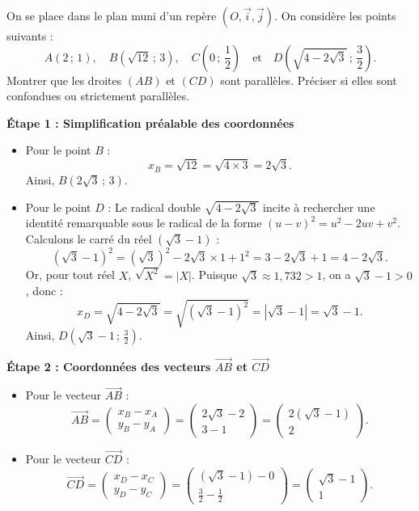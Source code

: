 \documentclass[11pt,a4paper]{article}
\newcommand{\vect}[1]{\overrightarrow{#1}}
\begin{document}
\begin{enoncebox}
On se place dans le plan muni d'un repère $(O, \vec{i}, \vec{j})$.
On considère les points suivants :
\[
A(2\,;\,1), \quad B(\sqrt{12}\,;\,3), \quad C\left(0\,;\,\frac{1}{2}\right) \quad \text{et} \quad D\left(\sqrt{4 - 2\sqrt{3}}\,;\,\frac{3}{2}\right).
\]
Montrer que les droites $(AB)$ et $(CD)$ sont parallèles. Préciser si elles sont confondues ou strictement parallèles.
\end{enoncebox}

\begin{correctionbox}
\textbf{Étape 1 : Simplification préalable des coordonnées}
\begin{itemize}[leftmargin=1cm]
    \item Pour le point $B$ :
    \[
    x_B = \sqrt{12} = \sqrt{4 \times 3} = 2\sqrt{3}.
    \]
    Ainsi, $B(2\sqrt{3}\,;\,3)$.
    \item Pour le point $D$ : Le radical double $\sqrt{4 - 2\sqrt{3}}$ incite à rechercher une identité remarquable sous le radical de la forme $(u - v)^2 = u^2 - 2uv + v^2$.
    Calculons le carré du réel $(\sqrt{3} - 1)$ :
    \[
    (\sqrt{3} - 1)^2 = (\sqrt{3})^2 - 2\sqrt{3} \times 1 + 1^2 = 3 - 2\sqrt{3} + 1 = 4 - 2\sqrt{3}.
    \]
    Or, pour tout réel $X$, $\sqrt{X^2} = |X|$. Puisque $\sqrt{3} \approx 1{,}732 > 1$, on a $\sqrt{3} - 1 > 0$, donc :
    \[
    x_D = \sqrt{4 - 2\sqrt{3}} = \sqrt{(\sqrt{3} - 1)^2} = |\sqrt{3} - 1| = \sqrt{3} - 1.
    \]
    Ainsi, $D\left(\sqrt{3} - 1\,;\,\frac{3}{2}\right)$.
\end{itemize}

\textbf{Étape 2 : Coordonnées des vecteurs $\vect{AB}$ et $\vect{CD}$}
\begin{itemize}[leftmargin=1cm]
    \item Pour le vecteur $\vect{AB}$ :
    \[
    \vect{AB} = \begin{pmatrix} x_B - x_A \\ y_B - y_A \end{pmatrix} = \begin{pmatrix} 2\sqrt{3} - 2 \\ 3 - 1 \end{pmatrix} = \begin{pmatrix} 2(\sqrt{3} - 1) \\ 2 \end{pmatrix}.
    \]
    \item Pour le vecteur $\vect{CD}$ :
    \[
    \vect{CD} = \begin{pmatrix} x_D - x_C \\ y_D - y_C \end{pmatrix} = \begin{pmatrix} (\sqrt{3} - 1) - 0 \\ \frac{3}{2} - \frac{1}{2} \end{pmatrix} = \begin{pmatrix} \sqrt{3} - 1 \\ 1 \end{pmatrix}.
    \]
\end{itemize}


\end{correctionbox}
\end{document}

